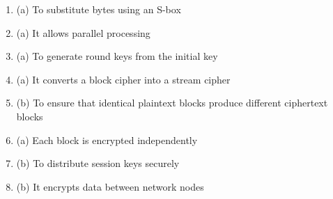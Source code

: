 \documentclass[12pt]{article}
\begin{document}
\begin{enumerate}
    \item (a) To substitute bytes using an S-box
    \item (a) It allows parallel processing
    \item (a) To generate round keys from the initial key
    \item (a) It converts a block cipher into a stream cipher
    \item (b) To ensure that identical plaintext blocks produce different ciphertext blocks
    \item (a) Each block is encrypted independently
    \item (b) To distribute session keys securely
    \item (b) It encrypts data between network nodes
\end{enumerate}
\end{document}
